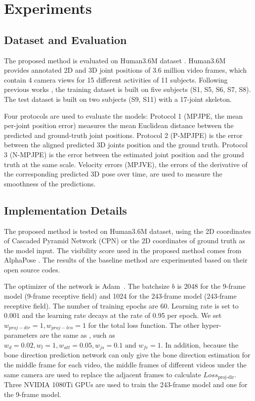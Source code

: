 \documentclass[journal]{IEEEtran}
\begin{document}
\section{Experiments}
\subsection{Dataset and Evaluation}
The proposed method is evaluated on Human3.6M dataset \cite{Catalin2014Human3}. Human3.6M provides annotated 2D and 3D joint positions of 3.6 million video frames, which contain 4 camera views for 15 different activities of 11 subjects. Following previous works  \cite{2018Propagating,hossain2018exploiting,20183D}, the training dataset is built on five subjects (S1, S5, S6, S7, S8). The test dataset is built on two subjects (S9, S11) with a 17-joint skeleton.

Four protocols are used to evaluate the models: Protocol 1 (MPJPE, the mean per-joint position error) measures the mean Euclidean distance between the predicted and ground-truth joint positions. Protocol 2 (P-MPJPE) is the error between the aligned predicted 3D joints position and the ground truth. Protocol 3 (N-MPJPE) is the error between the estimated joint position and the ground truth at the same scale. Velocity errors (MPJVE), the errors of the derivative of the corresponding predicted 3D pose over time, are used to measure the smoothness of the predictions.

\subsection{Implementation Details}
\label{suction:parameters}
The proposed method is tested on Human3.6M dataset, using the 2D coordinates of Cascaded Pyramid Network  \cite{20183D} (CPN) or the 2D coordinates of ground truth as the model input. The visibility score used in the proposed method comes from AlphaPose \cite{fang2017rmpe}. The results of the baseline method \cite{2020Anatomy} are experimented based on their open source codes.

The optimizer of the network is Adam~\cite{kingma2014adam}. {The batchsize $b$ is 2048 for the 9-frame model (9-frame receptive field) and 1024 for the 243-frame model (243-frame receptive field). The  number of training epochs are 60. Learning rate is set to $0.001$ and the learning rate decays at the rate of 0.95 per epoch.} We set $ w_{proj-dir} = 1, w_{proj-len} = 1$ for the total loss function. The other hyper-parameters are the same as \cite{2020Anatomy}, such as $w_d = 0.02, w_l = 1, w_{att} = 0.05, w_{js} = 0.1 \text{ and } w_{fc} = 1$. In addition, because the bone direction prediction network can only give the bone direction estimation for the middle frame for each video, the middle frames of different videos under the same camera are used to replace the adjacent frames to calculate $Loss_{\text{proj-dir}}$.
Three NVIDIA 1080Ti GPUs are used to train the 243-frame model and one for the 9-frame model. 
\end{document}
